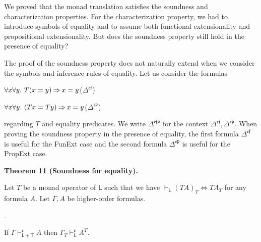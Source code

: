 \documentclass[10pt,a4paper]{article}
\begin{document}
We proved that the monad translation satisfies the soundness and characterization properties. For the characterization property, we had to introduce symbols of equality and to assume both functional extensionality and propositional extensionality. But does the soundness property still hold in the presence of equality?\par
 
 
 
The proof of the soundness property does not naturally extend when we consider the symbols and inference rules of equality. Let us consider the formulas\par
  
\par  \quad  $\displaystyle{\forall}x{\forall}y.\leavevmode\nobreak\ T(x=y)\mathbin{\Rightarrow}x=y$\quad  \quad  ($\Delta^{\mathfrak{e}\mathfrak{f}}$)\quad  
 
\par  \quad  $\displaystyle{\forall}x{\forall}y.\leavevmode\nobreak\ (Tx=Ty)\mathbin{\Rightarrow}x=y$\quad  \quad  ($\Delta^{\mathfrak{e}\mathfrak{p}}$)\quad  
  
regarding $T$ and equality predicates. We write $\Delta^{\mathfrak{e}\mathfrak{f}\mathfrak{p}}$ for the context $\Delta^{\mathfrak{e}\mathfrak{f}},\Delta^{\mathfrak{e}\mathfrak{p}}$. When proving the soundness property in the presence of equality, the first formula $\Delta^{\mathfrak{e}\mathfrak{f}}$ is useful for the FunExt case and the second formula $\Delta^{\mathfrak{e}\mathfrak{p}}$ is useful for the PropExt case.\par
 
 
 
\par\medskip\noindent\textbf{Theorem 11 (Soundness for equality).}\par
 
 
Let $T$ be a monad operator of $\mathsf{L}$ such that we have $\vdash_{\mathsf{L}}(TA)_{T}\Leftrightarrow TA_{T}$ for any formula $A$. Let $\Gamma,A$ be higher-order formulas.\par
  
\par{}. 
 
If $\Gamma\vdash_{\mathsf{L}+\mathsf{T}}^{\mathfrak{e}}A$ then $\Gamma_{T}\vdash_{\mathsf{L}}^{\mathfrak{e}}A^{T}$.\par
 
\end{document}
